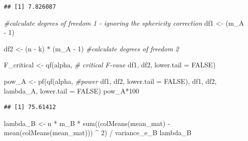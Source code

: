 \documentclass[
]{book}
\newenvironment{Shaded}{\begin{snugshade}}{\end{snugshade}}
\newcommand{\AttributeTok}[1]{\textcolor[rgb]{0.77,0.63,0.00}{#1}}
\newcommand{\CommentTok}[1]{\textcolor[rgb]{0.56,0.35,0.01}{\textit{#1}}}
\newcommand{\ConstantTok}[1]{\textcolor[rgb]{0.00,0.00,0.00}{#1}}
\newcommand{\DecValTok}[1]{\textcolor[rgb]{0.00,0.00,0.81}{#1}}
\newcommand{\FunctionTok}[1]{\textcolor[rgb]{0.00,0.00,0.00}{#1}}
\newcommand{\NormalTok}[1]{#1}
\newcommand{\OtherTok}[1]{\textcolor[rgb]{0.56,0.35,0.01}{#1}}
\newcommand{\SpecialCharTok}[1]{\textcolor[rgb]{0.00,0.00,0.00}{#1}}
\begin{document}
\begin{verbatim}
## [1] 7.826087
\end{verbatim}

\begin{Shaded}
\begin{Highlighting}[]
\CommentTok{\#calculate degrees of freedom 1 {-} ignoring the sphericity correction}
\NormalTok{df1 }\OtherTok{\textless{}{-}}\NormalTok{ (m\_A }\SpecialCharTok{{-}} \DecValTok{1}\NormalTok{) }

\NormalTok{df2 }\OtherTok{\textless{}{-}}\NormalTok{ (n }\SpecialCharTok{{-}}\NormalTok{ k) }\SpecialCharTok{*}\NormalTok{ (m\_A }\SpecialCharTok{{-}} \DecValTok{1}\NormalTok{) }\CommentTok{\#calculate degrees of freedom 2}

\NormalTok{F\_critical }\OtherTok{\textless{}{-}} \FunctionTok{qf}\NormalTok{(alpha, }\CommentTok{\# critical F{-}vaue}
\NormalTok{                 df1,}
\NormalTok{                 df2, }
                 \AttributeTok{lower.tail =} \ConstantTok{FALSE}\NormalTok{) }

\NormalTok{pow\_A }\OtherTok{\textless{}{-}} \FunctionTok{pf}\NormalTok{(}\FunctionTok{qf}\NormalTok{(alpha, }\CommentTok{\#power }
\NormalTok{             df1, }
\NormalTok{             df2, }
             \AttributeTok{lower.tail =} \ConstantTok{FALSE}\NormalTok{), }
\NormalTok{          df1, }
\NormalTok{          df2, }
\NormalTok{          lambda\_A, }
          \AttributeTok{lower.tail =} \ConstantTok{FALSE}\NormalTok{)}
\NormalTok{pow\_A}\SpecialCharTok{*}\DecValTok{100}
\end{Highlighting}
\end{Shaded}

\begin{verbatim}
## [1] 75.61412
\end{verbatim}

\begin{Shaded}
\begin{Highlighting}[]
\NormalTok{lambda\_B }\OtherTok{\textless{}{-}}
\NormalTok{  n }\SpecialCharTok{*}\NormalTok{ m\_B }\SpecialCharTok{*} \FunctionTok{sum}\NormalTok{((}\FunctionTok{colMeans}\NormalTok{(mean\_mat) }\SpecialCharTok{{-}} 
                   \FunctionTok{mean}\NormalTok{(}\FunctionTok{colMeans}\NormalTok{(mean\_mat))) }\SpecialCharTok{\^{}} \DecValTok{2}\NormalTok{) }\SpecialCharTok{/}\NormalTok{ variance\_e\_B }
\NormalTok{lambda\_B}
\end{Highlighting}
\end{Shaded}
\end{document}
